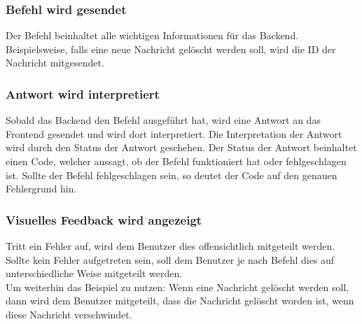 \subsubsection{Befehl wird gesendet}
Der Befehl beinhaltet alle wichtigen Informationen für das Backend. Beispielsweise, falls eine neue Nachricht gelöscht werden soll, wird die ID der Nachricht mitgesendet.

\subsubsection{Antwort wird interpretiert}
Sobald das Backend den Befehl ausgeführt hat, wird eine Antwort an das Frontend gesendet und wird dort interpretiert. Die Interpretation der Antwort wird durch den Status der Antwort geschehen. Der Status der Antwort beinhaltet einen Code, welcher aussagt, ob der Befehl funktioniert hat oder fehlgeschlagen ist. Sollte der Befehl fehlgeschlagen sein, so deutet der Code auf den genauen Fehlergrund hin.

\subsubsection{Visuelles Feedback wird angezeigt}
Tritt ein Fehler auf, wird dem Benutzer dies offensichtlich mitgeteilt werden.\\
Sollte kein Fehler aufgetreten sein, soll dem Benutzer je nach Befehl dies auf unterschiedliche Weise mitgeteilt werden.\\
Um weiterhin das Beispiel zu nutzen: Wenn eine Nachricht gelöscht werden soll, dann wird dem Benutzer mitgeteilt, dass die Nachricht gelöscht worden ist, wenn diese Nachricht verschwindet.